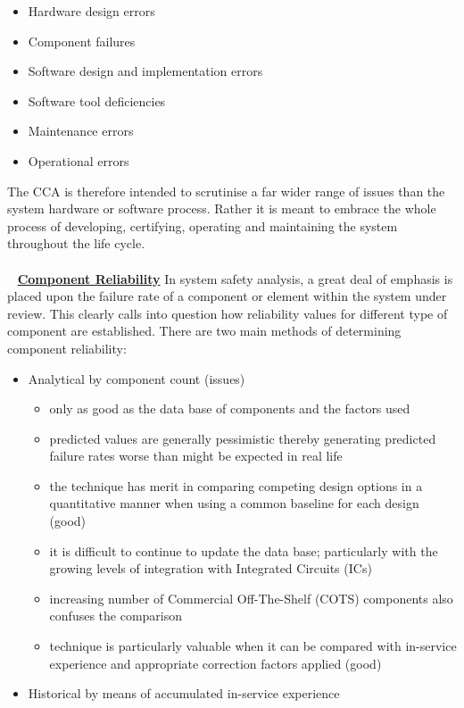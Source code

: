 \documentclass[9pt, landscape, fleqn]{scrartcl}
\begin{document}
\begin{multicols*}{3}
\begin{itemize}
    \item Hardware design errors
    \item Component failures
    \item Software design and implementation errors
    \item Software tool deficiencies
    \item Maintenance errors
    \item Operational errors
\end{itemize}
The CCA is therefore intended to scrutinise a far wider range of issues than the system hardware or software process. Rather it is meant to embrace the whole process of developing, certifying, operating and maintaining the system throughout the life cycle. \\ \\ 
\underline{\textbf{Component Reliability}}
In system safety analysis, a great deal of emphasis is placed upon the failure rate of a component or element within the system under review. This clearly calls into question how reliability values for different type of component are established. There are two main methods of determining component reliability:
\begin{itemize}
    \item Analytical by component count (issues)
    \begin{itemize}
        \item only as good as the data base of components and the factors used
        \item predicted values are generally pessimistic thereby generating predicted failure rates worse than might be expected in real life
        \item the technique has merit in comparing competing design options in a quantitative manner when using a common baseline for each design (good)
        \item it is difficult to continue to update the data base; particularly with the growing levels of integration with Integrated Circuits (ICs)
        \item increasing number of Commercial Off-The-Shelf (COTS) components also confuses the comparison
        \item technique is particularly valuable when it can be compared with in-service experience and appropriate correction factors applied (good)
    \end{itemize}
    \item Historical by means of accumulated in-service experience
    \begin{itemize}

\end{itemize}
\end{itemize}
\end{multicols*}
\end{document}
